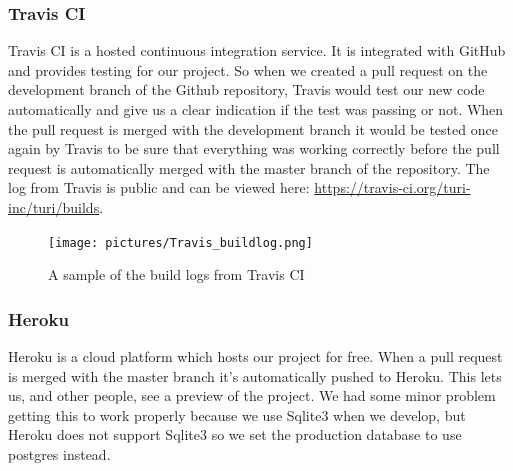 \documentclass[a4paper]{article}
\begin{document}
\subsubsection{Travis CI}
Travis CI is a hosted continuous integration service. It is integrated with GitHub and provides testing for our project. So when we created a pull request on the development branch of the Github repository, Travis would test our new code automatically and give us a clear indication if the test was passing or not. When the pull request is merged with the development branch it would be tested once again by Travis to be sure that everything was working correctly before the pull request is automatically merged with the master branch of the repository. The log from Travis is public and can be viewed here: \url{https://travis-ci.org/turi-inc/turi/builds}.

\begin{figure}[!h]
  \begin{center}
    \texttt{[image: pictures/Travis\_buildlog.png]}
    \caption{A sample of the build logs from Travis CI}
    \label{fig:travis_log}
  \end{center}
\end{figure}


\subsubsection{Heroku}
Heroku is a cloud platform which hosts our project for free. When a pull request is merged with the master branch it's automatically pushed to Heroku. This lets us, and other people, see a preview of the project. We had some minor problem getting this to work properly because we use Sqlite3 when we develop, but Heroku does not support Sqlite3 so we set the production database to use postgres instead.
\end{document}
